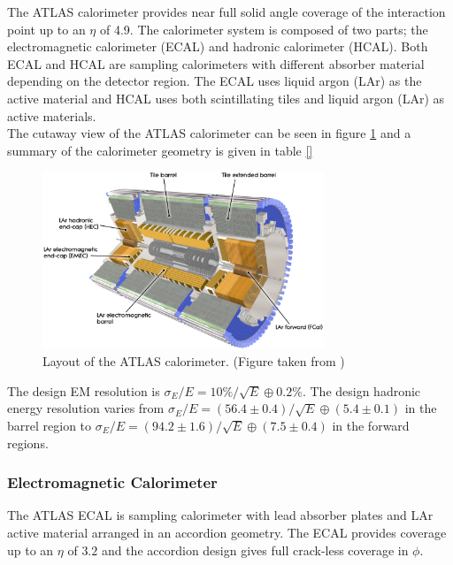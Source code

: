 \indent The ATLAS calorimeter provides near full solid angle coverage of the interaction point up to an $\eta$ of 4.9.  The calorimeter system is composed of two parts; the electromagnetic calorimeter (ECAL) and hadronic calorimeter (HCAL).  Both ECAL and HCAL are sampling calorimeters with different absorber material depending on the detector region.  The ECAL uses liquid argon (LAr) as the active material and HCAL uses both scintillating tiles and liquid argon (LAr) as active materials.  \\

\indent The cutaway view of the ATLAS calorimeter can be seen in figure \ref{LHC:fig:ATLASCalo} and a summary of the calorimeter geometry is given in table \ref{} \\

\begin{figure}[h!]
\centering
\includegraphics[width=0.75\textwidth, angle=0]{figures/LHC_ATLAS/Calorimeter_d3.eps}
\caption{ Layout of the ATLAS calorimeter. (Figure taken from \cite{ATLAS_JINST}) \label{LHC:fig:ATLASCalo}}
\end{figure}

\indent The design EM resolution is $\sigma_E/E = 10\%/\sqrt{E} \oplus 0.2\%$. The design hadronic energy resolution varies from $\sigma_E/E = (56.4\pm0.4)/\sqrt{E}\oplus(5.4\pm0.1)$ in the barrel region to $\sigma_E/E = (94.2\pm1.6)/\sqrt{E}\oplus(7.5\pm0.4)$ in the forward regions. \\

\subsubsection*{Electromagnetic Calorimeter}

\indent The ATLAS ECAL is sampling calorimeter with lead absorber plates and LAr active material arranged in an accordion geometry.  The ECAL provides coverage up to an $\eta$ of $3.2$ and the accordion design gives full crack-less coverage in $\phi$. \\%

